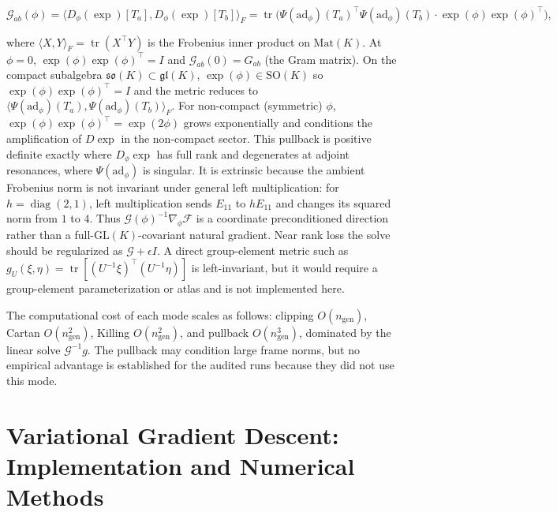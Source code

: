 \documentclass[twoside,11pt]{article}
\begin{document}
\begin{equation}
\mathcal{G}_{ab}(\phi)
=\langle D_\phi(\exp)[T_a], D_\phi(\exp)[T_b]\rangle_F
= \operatorname{tr}\bigl(\Psi(\mathrm{ad}_\phi)(T_a)^\top \Psi(\mathrm{ad}_\phi)(T_b) \cdot \exp(\phi)\exp(\phi)^\top\bigr),
\label{eq:pullback_metric}
\end{equation}

where $\langle X, Y \rangle_F = \operatorname{tr}(X^\top Y)$ is the Frobenius inner product on $\mathrm{Mat}(K)$. At $\phi = 0$, $\exp(\phi)\exp(\phi)^\top = I$ and $\mathcal{G}_{ab}(0) = G_{ab}$ (the Gram matrix). On the compact subalgebra $\mathfrak{so}(K) \subset \mathfrak{gl}(K)$, $\exp(\phi) \in \mathrm{SO}(K)$ so $\exp(\phi)\exp(\phi)^\top = I$ and the metric reduces to $\langle \Psi(\mathrm{ad}_\phi)(T_a), \Psi(\mathrm{ad}_\phi)(T_b)\rangle_F$. For non-compact (symmetric) $\phi$, $\exp(\phi)\exp(\phi)^\top = \exp(2\phi)$ grows exponentially and conditions the amplification of $D\exp$ in the non-compact sector. This pullback is positive definite exactly where $D_\phi\exp$ has full rank and degenerates at adjoint resonances, where $\Psi(\mathrm{ad}_\phi)$ is singular. It is extrinsic because the ambient Frobenius norm is not invariant under general left multiplication: for $h=\operatorname{diag}(2,1)$, left multiplication sends $E_{11}$ to $hE_{11}$ and changes its squared norm from $1$ to $4$. Thus $\mathcal{G}(\phi)^{-1}\nabla_\phi\mathcal{F}$ is a coordinate preconditioned direction rather than a full-$\mathrm{GL}(K)$-covariant natural gradient. Near rank loss the solve should be regularized as $\mathcal{G} + \epsilon I$. A direct group-element metric such as $g_U(\xi,\eta)=\operatorname{tr}[(U^{-1}\xi)^\top(U^{-1}\eta)]$ is left-invariant, but it would require a group-element parameterization or atlas and is not implemented here.

The computational cost of each mode scales as follows: clipping $O(n_{\mathrm{gen}})$, Cartan $O(n_{\mathrm{gen}}^2)$, Killing $O(n_{\mathrm{gen}}^2)$, and pullback $O(n_{\mathrm{gen}}^3)$, dominated by the linear solve $\mathcal{G}^{-1}g$. The pullback may condition large frame norms, but no empirical advantage is established for the audited runs because they did not use this mode.


\section{Variational Gradient Descent: Implementation and Numerical Methods}
\label{app:variational_descent}
\end{document}
